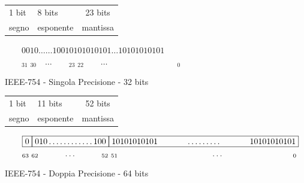 \begin{mdframed}[style=mdf]
\footnotesize
\hspace{4.5cm}\begin{tabular}{llc}
	1 bit & 8 bits    & \hspace{1cm}23 bits\\[-1ex]
	segno & esponente & \hspace{1cm}mantissa\\
\end{tabular}
\vspace{-2ex}\small\flushright
$\qquad \boxed{0}\boxed{010\ldots\ldots 100}\boxed{10101010101 \ldots 10101010101}$\\
$\qquad _{31}\;_{30}\quad\ldots\qquad _{23}\;_{22} \qquad \ldots\qquad\qquad\qquad\qquad\;_0$
\begin{center}\sffamily IEEE-754 - Singola Precisione - 32 bits \end{center}
\footnotesize\flushleft\hspace{0.2cm}
\begin{tabular}{llc}
	1 bit & \hspace{0.6cm}11 bits    & \hspace{2cm}52 bits\\[-1ex]
	segno & \hspace{0.6cm}esponente & \hspace{2cm}mantissa\\
\end{tabular}
\small\flushright
$\qquad \boxed{0}\boxed{010\ldots\ldots\ldots\ldots 100}\boxed{10101010101 \text{\hspace{1.2cm}}\ldots\ldots\ldots\text{\hspace{1.2cm}} 10101010101}$\\
$\qquad _{63}\;_{62}\qquad\quad\ldots\qquad\quad _{52}\;_{51} \text{\hspace{3.2cm}}\qquad \ldots\qquad\qquad\qquad\qquad\;_0$
\begin{center}\sffamily IEEE-754 - Doppia Precisione - 64 bits \end{center}
\end{mdframed}

